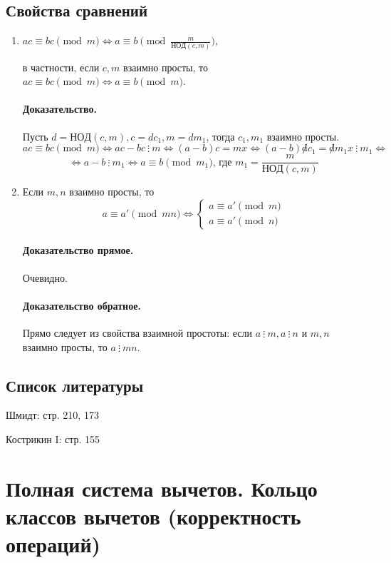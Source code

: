 \documentclass{article}
\newcommand{\cgcd}{\mathrm{НОД}}
\newcommand{\divs}{~\vdots~}
\begin{document}
\subsection{Свойства сравнений}
\begin{enumerate}
\item $ac \equiv bc \pmod{m} \Leftrightarrow a \equiv b \pmod{\frac{m}{\cgcd(c, m)}}$,

в частности, если $c, m$ взаимно просты, то $ac \equiv bc \pmod{m} \Leftrightarrow a \equiv b \pmod{m}$.
\paragraph{Доказательство.}
Пусть $d = \cgcd(c, m), c = dc_1, m = dm_1$, тогда $c_1, m_1$ взаимно просты.
\[ac \equiv bc \pmod{m} \Leftrightarrow ac - bc \divs m \Leftrightarrow (a-b) c = mx \Leftrightarrow (a-b)\not d c_1 = \not d m_1 x \divs m_1 \Leftrightarrow\]
\[\Leftrightarrow a-b \divs m_1 \Leftrightarrow a \equiv b \pmod{m_1} \text{, где } m_1 = \frac{m}{\cgcd(c, m)}\]

\item Если $m, n$ взаимно просты, то
\[a \equiv a' \pmod{mn} \Leftrightarrow 
\begin{cases}
a \equiv a' \pmod{m} \\
a \equiv a' \pmod{n}
\end{cases}
\]

\paragraph{Доказательство прямое.}
Очевидно.
\paragraph{Доказательство обратное.}
Прямо следует из свойства взаимной простоты: если $a \divs m, a \divs n$ и $m, n$ взаимно просты, то $a \divs mn$.
\end{enumerate}

\subsection*{Список литературы}
Шмидт: стр. 210, 173

Кострикин I: стр. 155


\newpage
\section{Полная система вычетов. Кольцо классов вычетов (корректность операций)}
\end{document}
